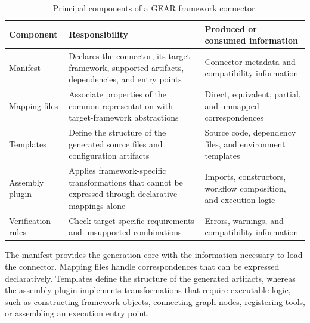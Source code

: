 \begin{table}[t]
    \centering
    \caption{Principal components of a GEAR framework connector.}
    \label{tab:connector-components}
    \footnotesize
    \begin{tabularx}{\textwidth}{
        @{}
        p{}
        >{\raggedright\arraybackslash}X
        p{}
        @{}
    }
        \toprule
        \textbf{Component}
        & \textbf{Responsibility}
        & \textbf{Produced or consumed information} \\
        \midrule

        Manifest
        & Declares the connector, its target framework, supported artifacts,
        dependencies, and entry points
        & Connector metadata and compatibility information \\

        Mapping files
        & Associate properties of the common representation with
        target-framework abstractions
        & Direct, equivalent, partial, and unmapped correspondences \\

        Templates
        & Define the structure of the generated source files and configuration
        artifacts
        & Source code, dependency files, and environment templates \\

        Assembly plugin
        & Applies framework-specific transformations that cannot be expressed
        through declarative mappings alone
        & Imports, constructors, workflow composition, and execution logic \\

        Verification rules
        & Check target-specific requirements and unsupported combinations
        & Errors, warnings, and compatibility information \\

        \bottomrule
    \end{tabularx}
\end{table}

The manifest provides the generation core with the information necessary to
load the connector. Mapping files handle correspondences that can be expressed
declaratively. Templates define the structure of the generated artifacts,
whereas the assembly plugin implements transformations that require executable
logic, such as constructing framework objects, connecting graph nodes,
registering tools, or assembling an execution entry point.

